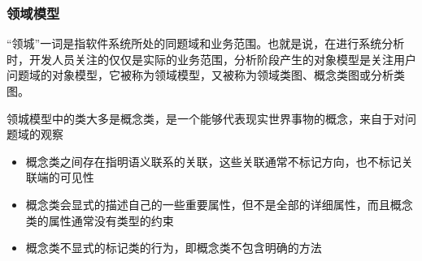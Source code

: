 \begin{figure}[H]
	\centering
	\vspace{-1em}
\end{figure}

\subsubsection{领域模型}
“领城”一词是指软件系统所处的同题域和业务范围。也就是说，在进行系统分析时，开发人员关注的仅仅是实际的业务范围，分析阶段产生的对象模型是关注用户问题域的对象模型，它被称为领域模型，又被称为领域类图、概念类图或分析类图。

领城模型中的类大多是概念类，是一个能够代表现实世界事物的概念，来自于对问题域的观察
\begin{itemize}
    \item 概念类之间存在指明语义联系的关联，这些关联通常不标记方向，也不标记关联端的可见性
    \item 概念类会显式的描述自己的一些重要属性，但不是全部的详细属性，而且概念类的属性通常没有类型的约束
    \item 概念类不显式的标记类的行为，即概念类不包含明确的方法
\end{itemize}

